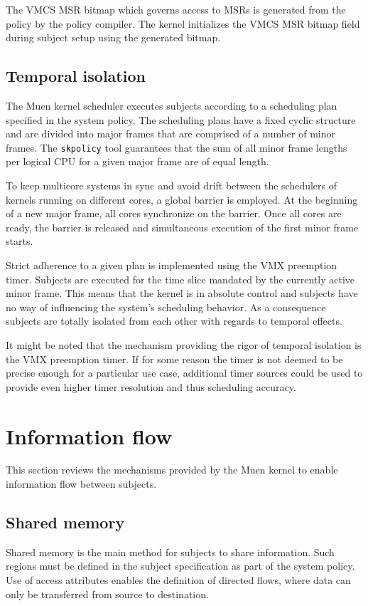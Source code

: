 The VMCS MSR bitmap which governs access to MSRs is generated from the policy by
the policy compiler. The kernel initializes the VMCS MSR bitmap field during
subject setup using the generated bitmap.

\subsection{Temporal isolation}\label{subsec:temp-isolation}
The Muen kernel scheduler executes subjects according to a scheduling plan
specified in the system policy. The scheduling plans have a fixed cyclic
structure and are divided into major frames that are comprised of a number of
minor frames. The \texttt{skpolicy} tool guarantees that the sum of all minor
frame lengths per logical CPU for a given major frame are of equal length.

To keep multicore systems in sync and avoid drift between the schedulers of
kernels running on different cores, a global barrier is employed. At the
beginning of a new major frame, all cores synchronize on the barrier. Once all
cores are ready, the barrier is released and simultaneous execution of the
first minor frame starts.

Strict adherence to a given plan is implemented using the VMX preemption timer.
Subjects are executed for the time slice mandated by the currently active minor
frame. This means that the kernel is in absolute control and subjects have no
way of influencing the system's scheduling behavior. As a consequence subjects
are totally isolated from each other with regards to temporal effects.

It might be noted that the mechanism providing the rigor of temporal isolation
is the VMX preemption timer. If for some reason the timer is not deemed to be
precise enough for a particular use case, additional timer sources could be used
to provide even higher timer resolution and thus scheduling accuracy.

\section{Information flow}\label{sec:information-flow}
This section reviews the mechanisms provided by the Muen kernel to enable
information flow between subjects.

\subsection{Shared memory}
Shared memory is the main method for subjects to share information. Such regions
must be defined in the subject specification as part of the system policy. Use of
access attributes enables the definition of directed flows, where data can only
be transferred from source to destination.

